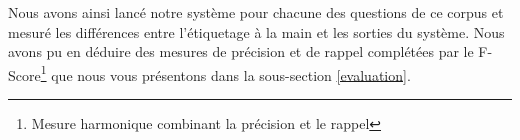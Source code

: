 \documentclass[10pt,a4paper]{article}
\begin{document}

\par Nous avons ainsi lancé notre système pour chacune des questions de ce corpus et mesuré les différences entre l'étiquetage \og{}à la main\fg{} et les sorties du système. Nous avons pu en déduire des mesures de précision et de rappel complétées par le F-Score\footnote{Mesure harmonique combinant la précision et le rappel} que nous vous présentons dans la sous-section \ref{evaluation}.




\end{document}
